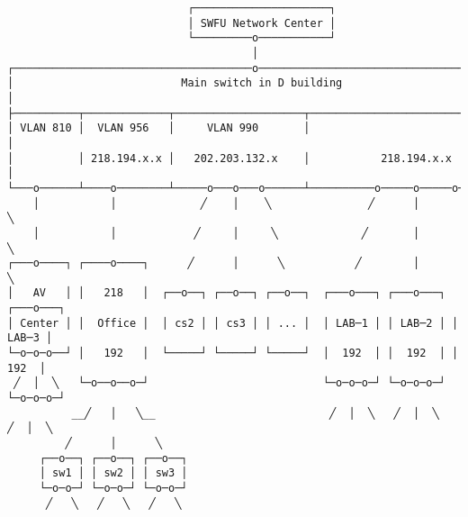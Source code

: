 \documentclass[varwidth=40cm,crop]{standalone}
\begin{document}
\begin{verbatim}
                            ┌─────────────────────┐
                            │ SWFU Network Center │
                            └─────────o───────────┘
                                      │
┌─────────────────────────────────────o──────────────────────────────────────┐
│                          Main switch in D building                         │
├──────────┬─────────────┬────────────────────┬──────────────────────────────┤
│ VLAN 810 │  VLAN 956   │     VLAN 990       │                              │
│          │ 218.194.x.x │   202.203.132.x    │           218.194.x.x        │
└───o──────┴────o────────┴─────o───o───o──────┴──────────o─────o─────o───────┘
    │           │             ╱    │    ╲               ╱      │      ╲
    │           │            ╱     │     ╲             ╱       │       ╲
┌───o────┐ ┌────o────┐      ╱      │      ╲           ╱        │        ╲
│   AV   │ │   218   │  ┌──o──┐ ┌──o──┐ ┌──o──┐  ┌───o───┐ ┌───o───┐ ┌───o───┐
│ Center │ │  Office │  │ cs2 │ │ cs3 │ │ ... │  │ LAB─1 │ │ LAB─2 │ │ LAB─3 │
└─o─o─o──┘ │   192   │  └─────┘ └─────┘ └─────┘  │  192  │ │  192  │ │  192  │
 ╱  │  ╲   └─o──o──o─┘                           └─o─o─o─┘ └─o─o─o─┘ └─o─o─o─┘
          __╱   │   ╲__                           ╱  │  ╲   ╱  │  ╲   ╱  │  ╲
         ╱      │      ╲
     ┌──o──┐ ┌──o──┐ ┌──o──┐
     │ sw1 │ │ sw2 │ │ sw3 │
     └─o─o─┘ └─o─o─┘ └─o─o─┘
      ╱   ╲   ╱   ╲   ╱   ╲
\end{verbatim}
\end{document}
